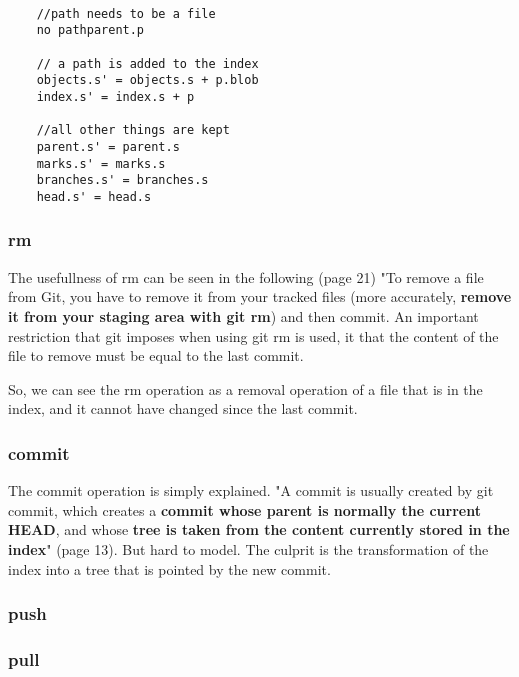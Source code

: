 \begin{lstlisting}

	//path needs to be a file
	no pathparent.p

	// a path is added to the index
	objects.s' = objects.s + p.blob
	index.s' = index.s + p

	//all other things are kept
	parent.s' = parent.s
	marks.s' = marks.s
	branches.s' = branches.s
	head.s' = head.s 

\end{lstlisting}

\subsubsection{rm}

The usefullness of rm can be
seen in the following \cite{progit}
(page 21) "To remove a file from Git, you have to remove it
from your tracked files (more accurately, {\bf remove it from your
staging area with git rm}) and then commit.
An important restriction that git imposes when using git rm is used,
it that the
content of the file to remove must be equal to the last commit. \par
So, we can see the rm operation as a removal operation of a file
that is in the index, and it cannot have changed since the last
commit. \par


\subsubsection{commit}

The commit operation is simply explained. 
"A commit is usually created by git commit, which creates a {\bf commit whose parent is 
normally the current HEAD}, and whose {\bf tree is taken from the content currently stored
in the index}" \cite{gitComm} (page 13).
But hard to model. The culprit is the transformation of the index into a tree that is pointed
by the new commit.

\subsubsection{push}

\subsubsection{pull}
